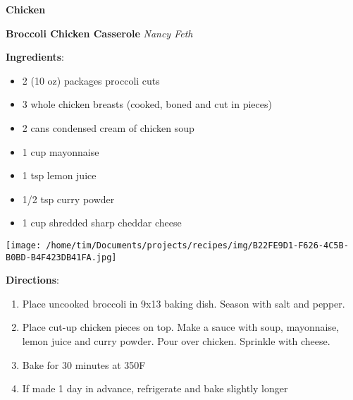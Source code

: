 \documentclass[11pt, twoside, openany]{book}
\begin{document}
{\newpage \LARGE \textbf{Chicken}} \label{chicken}\\
\noindent\begin{minipage}[t]{\linewidth}%
{\Large\textbf{Broccoli Chicken Casserole}} \label{broccoli-chicken-casserole}\hfill\textit{Nancy Feth}\\
\noindent\begin{minipage}[t]{0.78\linewidth}%
\textbf{Ingredients}:\vspace{-3mm}
\begin{multicols}{2}
\begin{itemize}\setlength\itemsep{-1mm}
\item 2 (10 oz) packages proccoli cuts
\item 3 whole chicken breasts (cooked, boned and cut in pieces)
\item 2 cans condensed cream of chicken soup
\item 1 cup mayonnaise
\item 1 tsp lemon juice
\item 1/2 tsp curry powder
\item 1 cup shredded sharp cheddar cheese
\end{itemize}
\end{multicols}
\end{minipage}
\noindent\begin{minipage}[t]{0.18\linewidth}
\centering \strut\vspace*{-\baselineskip}\newline
\texttt{[image: /home/tim/Documents/projects/recipes/img/B22FE9D1-F626-4C5B-B0BD-B4F423DB41FA.jpg]}\\
\end{minipage}\vspace{3mm}
\textbf{Directions}:
\vspace{-3mm}\begin{enumerate}\setlength\itemsep{-1mm}
\item Place uncooked broccoli in 9x13 baking dish. Season with salt and pepper.
\item Place cut-up chicken pieces on top. Make a sauce with soup, mayonnaise, lemon juice and curry powder. Pour over chicken. Sprinkle with cheese.
\item Bake for 30 minutes at 350F
\item If made 1 day in advance, refrigerate and bake slightly longer
\end{enumerate}
\end{minipage}\vspace{8mm}
\end{document}
